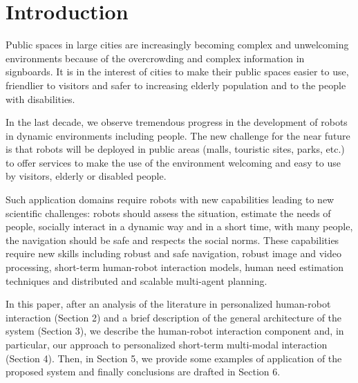 \section{Introduction}

Public spaces in large cities are increasingly becoming complex and unwelcoming environments because of the overcrowding and complex information in signboards. It is in the interest of cities to make their public spaces easier to use, friendlier to visitors and safer to increasing elderly population and to the people with disabilities.

In the last decade, we observe tremendous progress in the development of robots in dynamic environments %
including people. The new challenge for the near future is that robots will be deployed in public areas (malls, touristic sites, parks, etc.) to offer services to make the use of the environment welcoming and easy to use by visitors, elderly or disabled people. 

Such application domains require robots with new capabilities leading to new scientific challenges: robots should assess the situation, estimate the needs of people, socially interact in a dynamic way and in a short time, with many people, the navigation should be safe and respects the social norms. These capabilities require new skills including robust and safe navigation, robust image and video processing, short-term human-robot interaction models, human need estimation techniques and distributed and scalable multi-agent planning.


In this paper, after an analysis of the literature in personalized human-robot interaction (Section 2) and a brief description of the general architecture of the \coaches system (Section 3), we describe the human-robot interaction component and, in particular, our approach to personalized short-term multi-modal interaction (Section 4). Then, in Section 5, we provide some examples of application of the proposed system and finally conclusions are drafted in Section 6.


